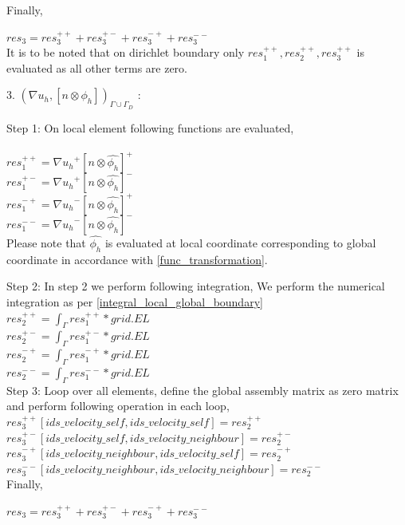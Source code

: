 \documentclass[a4paper,10pt]{book}
\begin{document}
Finally,

$res_3 = res_3^{++} + res_3^{+-} + res_3^{-+} + res_3^{--}$\\

It is to be noted that on dirichlet boundary only $res_1^{++}, res_2^{++}, res_3^{++}$ is evaluated as all other terms are zero.

3. $({\nabla u_h}, [n \otimes \phi_h])_{\Gamma \cup \Gamma_D}$ :

Step 1: On local element following functions are evaluated,\\
\\
$res_1^{++} = {\nabla u_h}^+ [n \otimes \hat{\phi_h}]^+$\\
$res_1^{+-} = {\nabla u_h}^+ [n \otimes \hat{\phi_h}]^-$\\
$res_1^{-+} = {\nabla u_h}^- [n \otimes \hat{\phi_h}]^+$\\
$res_1^{--} = {\nabla u_h}^- [n \otimes \hat{\phi_h}]^-$\\

Please note that $\hat{\phi_h}$ is evaluated at local coordinate corresponding to global coordinate in accordance with \ref{func_transformation}.

Step 2: In step 2 we perform following integration, 
We perform the numerical integration as per \ref{integral_local_global_boundary}
\\ 
$res_2^{++} = \int_{\Gamma} res_1^{++} * grid.EL$\\
$res_2^{+-} = \int_{\Gamma} res_1^{+-} * grid.EL$\\
$res_2^{-+} = \int_{\Gamma} res_1^{-+} * grid.EL$\\
$res_2^{--} = \int_{\Gamma} res_1^{--} * grid.EL$\\

Step 3: Loop over all elements, define the global assembly matrix as zero matrix and perform following operation in each loop,
\\
$res_3^{++}[ids\_velocity\_self,ids\_velocity\_self] = res_2^{++}$\\
$res_3^{+-}[ids\_velocity\_self,ids\_velocity\_neighbour] = res_2^{+-}$\\
$res_3^{-+}[ids\_velocity\_neighbour,ids\_velocity\_self] = res_2^{-+}$\\
$res_3^{--}[ids\_velocity\_neighbour,ids\_velocity\_neighbour] = res_2^{--}$\\

Finally,

$res_3 = res_3^{++} + res_3^{+-} + res_3^{-+} + res_3^{--}$\\
\end{document}
